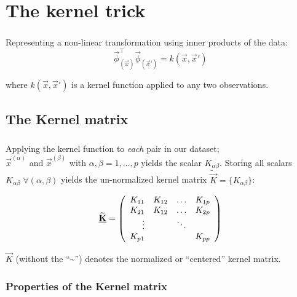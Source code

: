 \section{The kernel trick}

\begin{frame}\frametitle{\secname}

Representing a non-linear transformation using inner products of the data:
\begin{equation}
 \label{eq:trick}
      \vec{\phi}_{(\vec{x})}^\top 
		\vec{\phi}_{(\vec{x}')} = 
      k(\vec{x}, \vec{x}')
\end{equation}
    
where $k(\vec{x}, \vec{x}')$ is a kernel function applied 
to any two observations.

\end{frame}

\subsection{The Kernel matrix}

\begin{frame}\frametitle{\subsecname}

Applying the kernel function to \emph{each} pair in our dataset; \\
$\vec x^{(\alpha)}$ and $\vec{x}^{(\beta)}$ 
with $\alpha, \beta = 1, \ldots, p$ yields the scalar $K_{\alpha \beta}$. 
Storing all scalars $K_{\alpha \beta} \; \forall (\alpha,\beta)$ yields 
the un-normalized kernel matrix $\widetilde {\vec K}=\{K_{\alpha \beta}\}$:

\begin{equation}
\widetilde {\underline{\mathbf{K}}} = 
\left( \begin{array}{rrrrrrrrrrrrrrrrrrrrrrrrrr} 
K_{11} & K_{12} & \ldots & K_{1p} \\
K_{21} & K_{12} & \ldots & K_{2p} \\
\vdots & & \ddots\\
K_{p1} & & & K_{pp}
\\ \end{array} \right)
\end{equation}

$\vec K$ (without the ``\textasciitilde'') denotes the normalized or ``centered'' kernel matrix. 


\end{frame}

\subsubsection{Properties of the Kernel matrix}

